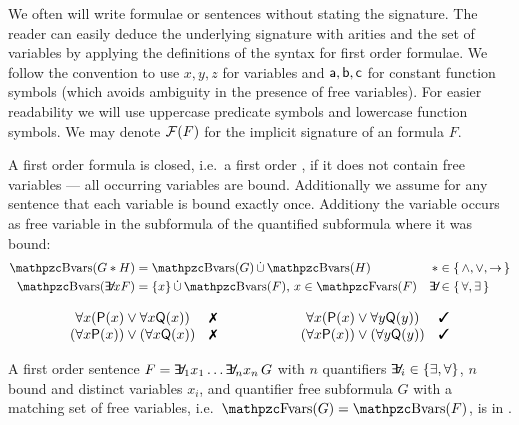 We often will write formulae or sentences
without stating the signature.
The reader can easily deduce the underlying  signature with arities
and the set of variables by applying the definitions of the syntax for first order formulae.
We follow the convention to use \( x,y,z \) for variables
and \( \mathsf{a},\mathsf{b},\mathsf{c} \) for constant function symbols
(which avoids ambiguity in the presence of free variables).
For easier readability we will use uppercase predicate symbols and lowercase function symbols.
We may denote \( \mathcal{F}(F) \) for the implicit signature of an formula \( F \).

\begin{definition}\label{def:fof:closed}\label{def:fof:sentence}
	A first order formula is closed, i.e.~a first order ,
	if it does not contain free variables --- all occurring variables are bound.
	Additionally we assume for any sentence
	that each variable is bound exactly once.
	Additiony the variable occurs as free variable
	in the subformula of the quantified subformula
	where it was bound:
	\begin{align*}
	\bvar(G * H) &= \bvar(G)\disjointunion\bvar(H)
	 &*& \in \{ \, \land, \lor, \limp \, \}
	\\
	\bvar(\quantify x F) &= \{x\}\disjointunion\bvar(F)\text{, } x\in\fvar(F)
	&\quantify& \in \{ \, \forall, \exists \, \}
\end{align*}
\end{definition}

\begin{example}
	\[
	\begin{array}{clccl}
		\forall x ({\mP(x) \lor \forall x {\mQ(x)}}) &
		\text{\xmark}
		&\qquad\qquad
		&
		\forall x ({\mP(x) \lor \forall y {\mQ(y)}}) &
		\text{\cmark}
		\\
		(\forall x {\mP(x)}) \lor (\forall x {\mQ(x)}) &
		\text{\xmark}
		&&
		(\forall x {\mP(x)}) \lor (\forall y {\mQ(y)}) &
		\text{\cmark}
	\end{array}
	\]

\end{example}

\begin{definition}[\PNF]
	A first order sentence \( F = \quantify_1 x_1 \ldots \quantify_n x_n\, G \)
	with \( n \) quantifiers \( \quantify_i \in \{ \exists, \forall \} \),
	\( n \) bound and distinct variables \( x_i \),
	and quantifier free subformula \( G \) with
	a matching set of free variables, i.e.~\( \fvar(G) = \bvar(F) \),
	is in .
\end{definition}


